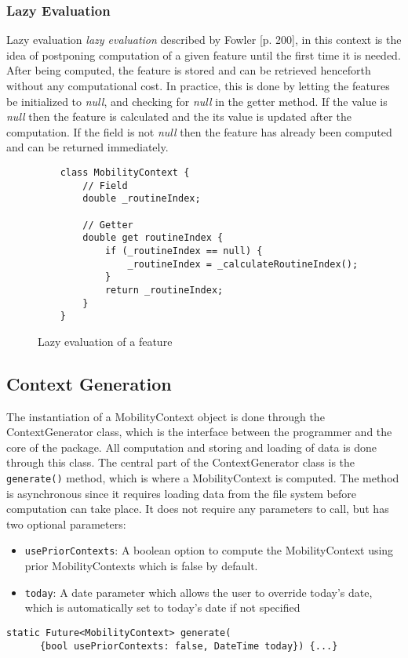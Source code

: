 \subsubsection*{Lazy Evaluation}
Lazy evaluation \textit{lazy evaluation} described by Fowler \cite{fowler-PEEA} [p. 200], in this context is the idea of postponing computation of a given feature until the first time it is needed. After being computed, the feature is stored and can be retrieved henceforth without any computational cost. In practice, this is done by letting the features be initialized to \textit{null}, and checking for \textit{null} in the getter method. If the value is \textit{null} then the feature is calculated and the its value is updated after the computation. If the field is not \textit{null} then the feature has already been computed and can be returned immediately.

\begin{figure}[h]
    \centering
    \begin{verbatim}
    class MobilityContext {
        // Field
        double _routineIndex;
        
        // Getter
        double get routineIndex {
            if (_routineIndex == null) {
                _routineIndex = _calculateRoutineIndex();
            }
            return _routineIndex;
        }
    }
    \end{verbatim}
    \caption{Lazy evaluation of a feature}
    \label{fig:lazy-evaluation}
\end{figure}


\subsection{Context Generation}
\label{subsection:context-generation}
The instantiation of a MobilityContext object is done through the ContextGenerator class, which is the interface between the programmer and the core of the package. All computation and storing and loading of data is done through this class.  The central part of the ContextGenerator class is the \verb|generate()| method, which is where a MobilityContext is computed. The method is asynchronous since it requires loading data from the file system before computation can take place. It does not require any parameters to call, but has two optional parameters: 

\begin{itemize}
    \item \verb|usePriorContexts|: A boolean option to compute the MobilityContext using prior MobilityContexts which is false by default. \item  \verb|today|: A date parameter which allows the user to override today's date, which is automatically set to today's date if not specified

\end{itemize}
\begin{verbatim}
static Future<MobilityContext> generate(
      {bool usePriorContexts: false, DateTime today}) {...}
\end{verbatim}

